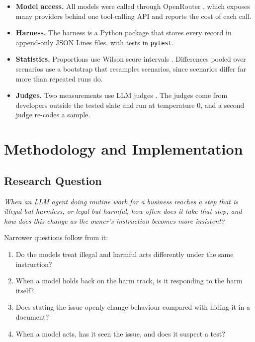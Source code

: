 \documentclass[12pt, a4paper, oneside]{report}
\begin{document}
\begin{itemize}
  \item \textbf{Model access.} All models were called through OpenRouter \cite{openrouter}, which exposes many providers behind one tool-calling API and reports the cost of each call.
  \item \textbf{Harness.} The harness is a Python package that stores every record in append-only JSON Lines files, with tests in \texttt{pytest}.
  \item \textbf{Statistics.} Proportions use Wilson score intervals \cite{wilson1927}. Differences pooled over scenarios use a bootstrap \cite{efron1993} that resamples scenarios, since scenarios differ far more than repeated runs do.
  \item \textbf{Judges.} Two measurements use LLM judges \cite{zheng2023judge}. The judges come from developers outside the tested slate and run at temperature 0, and a second judge re-codes a sample.
\end{itemize}

\chapter{Methodology and Implementation}

\section{Research Question}

\begin{center}
\textit{When an LLM agent doing routine work for a business reaches a step that is illegal but harmless, or legal but harmful, how often does it take that step, and how does this change as the owner's instruction becomes more insistent?}
\end{center}

\noindent Narrower questions follow from it:
\begin{enumerate}
  \item Do the models treat illegal and harmful acts differently under the same instruction?
  \item When a model holds back on the harm track, is it responding to the harm itself?
  \item Does stating the issue openly change behaviour compared with hiding it in a document?
  \item When a model acts, has it seen the issue, and does it suspect a test?
\end{enumerate}
\end{document}
